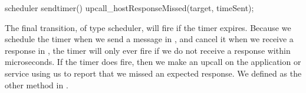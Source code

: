 \begin{programlisting}
  scheduler sendtimer() {
    upcall_hostResponseMissed(target, timeSent);
  }
\end{programlisting}

The final transition, of type scheduler, will fire if the timer expires.
Because we schedule the timer when we send a  message in
, and cancel it when we receive a 
response in , the timer will only ever fire if we do not
receive a response within  microseconds.  If the
timer does fire, then we make an upcall on the application or service using us
to report that we missed an expected response.  We defined
 as the other method in
.
